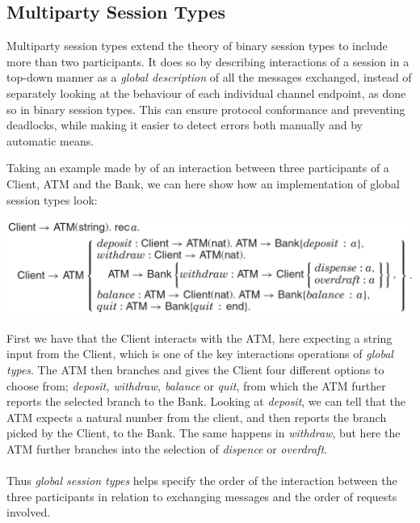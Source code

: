 
\subsection{Multiparty Session Types}
Multiparty session types extend the theory of binary session types to include more than two participants. It does so by describing interactions of a session in a top-down manner as a \textit{global description} of all the messages exchanged, instead of separately looking at the behaviour of each individual channel endpoint, as done so in binary session types. This can ensure protocol conformance and preventing deadlocks, while making it easier to detect errors both manually and by automatic means.  %

Taking an example made by \citeauthor{DBLP:journals/csur/HuttelLVCCDMPRT16} of an interaction between three participants of a Client, ATM and the Bank, we can here show how an implementation of global session types look:
\begin{center}
\includegraphics[width=1.0\textwidth, angle=0]{Graphics/Client_ATM.pdf}
\end{center}
First we have that the Client interacts with the ATM, here expecting a string input from the Client, which is one of the key interactions operations of \textit{global types}. The ATM then branches and gives the Client four different options to choose from; \textit{deposit, withdraw, balance} or \textit{quit}, from which the ATM further reports the selected branch to the Bank. Looking at \textit{deposit}, we can tell that the ATM expects a natural number from the client, and then reports the branch picked by the Client, to the Bank. The same happens in \textit{withdraw}, but here the ATM further branches into the selection of \textit{dispence} or \textit{overdraft}.
\\ \\
Thus \textit{global session types} helps specify the order of the interaction between the three participants in relation to exchanging messages and the order of requests involved.  

